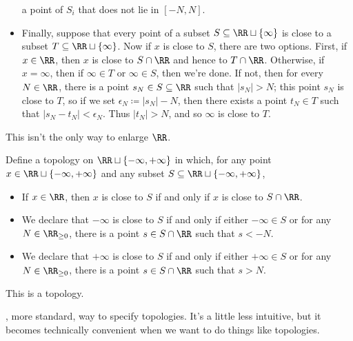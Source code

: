 \begin{exm}
\begin{itemize}
		a point of $S_i$ that does not lie in $[-N,N]$.
		\item Finally, suppose that every point of a subset $S\subseteq\RR\sqcup\{\infty\}$ is close to a subset $T\subseteq\RR\sqcup\{\infty\}$.
			Now if $x$ is close to $S$, there are two options.
			First, if $x\in\RR$, then $x$ is close to $S\cap\RR$ and hence to $T\cap\RR$.
			Otherwise, if $x=\infty$, then if $\infty\in T$ or $\infty\in S$, then we're done.
			If not, then for every $N\in\RR$, there is a point $s_N\in S\subseteq\RR$ such that $|s_N|>N$;
			this point $s_N$ is close to $T$, so if we set $\epsilon_N\coloneq|s_N|-N$, then there exists a point $t_N\in T$ such that $|s_N-t_N|<\epsilon_N$.
			Thus $|t_N|>N$, and so $\infty$ is close to $T$.
	\end{itemize}
\end{exm}

This isn't the only way to enlarge $\RR$.
\begin{exm}
	Define a topology on $\RR\sqcup\{-\infty,+\infty\}$ in which, for any point $x\in\RR\sqcup\{-\infty,+\infty\}$ and any subset $S\subseteq\RR\sqcup\{-\infty,+\infty\}$,
	\begin{itemize}
		\item If $x\in\RR$, then $x$ is close to $S$ if and only if $x$ is close to $S\cap\RR$.
		\item We declare that $-\infty$ is close to $S$ if and only if either $-\infty\in S$ or for any $N\in\RR_{\geq 0}$, there is a point $s\in S\cap\RR$ such that $s<-N$.
		\item We declare that $+\infty$ is close to $S$ if and only if either $+\infty\in S$ or for any $N\in\RR_{\geq 0}$, there is a point $s\in S\cap\RR$ such that $s>N$.
	\end{itemize}
        This is a topology.%
\end{exm}

, more standard, way to specify topologies.
It's a little less intuitive, but it becomes technically convenient when we want to do things like  topologies.

